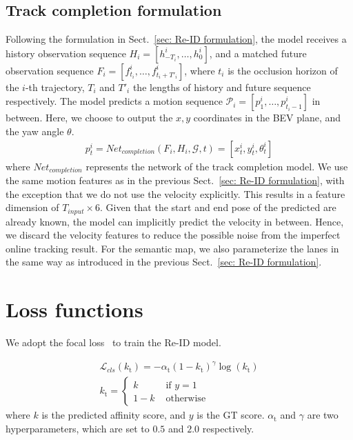 \documentclass{article} \usepackage{iclr2023_conference,times}
\begin{document}
\subsection{Track completion formulation}
\label{sec: Track completion formulation}
Following the formulation in Sect.~\ref{sec: Re-ID formulation}, the model receives a history observation sequence $H_{i} = \left[ h^{i}_{-T_i}, \ldots, h^{i}_{0}\right]$, and a matched future observation sequence  $F_{i}=\left[ f^{i}_{t_i}, \ldots, f^{i}_{t_i+T'_{i}}\right]$, where $t_i$ is the occlusion horizon of the $i$-th trajectory, $T_i$ and $T'_i$ the lengths of history and future sequence respectively. The model predicts a motion sequence $\mathcal{P}_i=\left[ p^{i}_{1}, \ldots, p^{i}_{t_i-1}\right]$ in between. Here, we choose to output the $x,y$ coordinates in the BEV plane, and the yaw angle $\theta$. 
\begin{equation}\label{eq:track completion formulation}
\begin{aligned}
    p^{i}_{t} = Net_{completion}(F_{i},H_{i},\mathcal{G},t)=\left[x^i_t,y^i_t,\theta^i_t \right]
\end{aligned}
\end{equation}
where $Net_{completion}$ represents the network of the track completion model. We use the same motion features as in the previous Sect.~\ref{sec: Re-ID formulation}, with the exception that we do not use the velocity explicitly. This results in a feature dimension of $T_{input} \times 6$. Given that the start and end pose of the predicted are already known, the model can implicitly predict the velocity in between. Hence, we discard the velocity features to reduce the possible noise from the imperfect online tracking result. For the semantic map, we also parameterize the lanes in the same way as introduced in the previous Sect.~\ref{sec: Re-ID formulation}. 

\section{Loss functions} 
\label{sec: loss formulas}
We adopt the focal loss~\cite{focal_loss} to train the Re-ID model.

\begin{equation}
\label{eq: focal loss}
\begin{aligned}
\mathcal{L}_{cls}\left(k_{\mathrm{t}}\right)=-\alpha_{\mathrm{t}}\left(1-k_{\mathrm{t}}\right)^\gamma \log \left(k_{\mathrm{t}}\right) \\
k_{\mathrm{t}}= \begin{cases}k & \text { if } y=1 \\ 1-k & \text { otherwise }\end{cases}
\end{aligned}
\end{equation}
where $k$ is the predicted affinity score, and $y$ is the GT score. $\alpha_{\mathrm{t}}$ and $\gamma$ are two hyperparameters, which are set to $0.5$ and $2.0$ respectively. 
\end{document}
